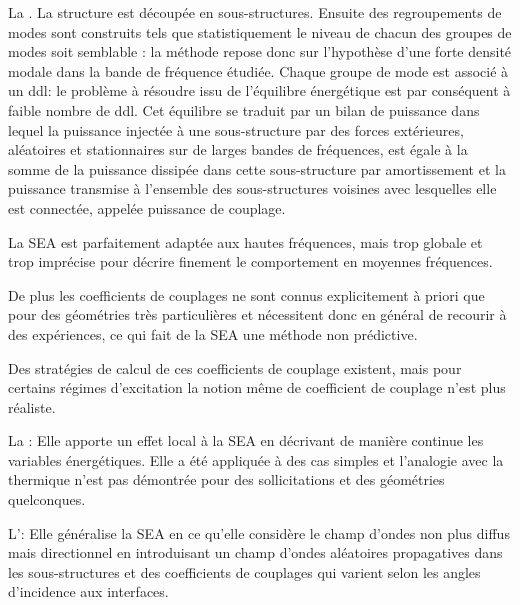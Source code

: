 \bigskip
La .
La structure est découpée en sous-structures.
Ensuite des regroupements de modes sont construits tels que statistiquement le niveau
de chacun des groupes de modes soit semblable : la méthode repose donc sur l'hypothèse
d'une forte densité modale dans la bande de fréquence étudiée.
Chaque groupe de mode est associé à un ddl: le problème à résoudre issu
de l'équilibre énergétique est par conséquent à faible nombre de ddl.
Cet équilibre se traduit par un bilan de puissance dans lequel la puissance injectée
à une sous-structure par des forces extérieures, aléatoires et stationnaires sur de
larges bandes de fréquences, est égale à la somme de la puissance dissipée
dans cette sous-structure par amortissement et la puissance transmise à l'ensemble
des sous-structures voisines avec lesquelles elle est connectée, appelée puissance
de couplage.

La SEA est parfaitement adaptée aux hautes fréquences, mais trop globale et trop imprécise pour
décrire finement le comportement en moyennes fréquences.

De plus les coefficients de couplages ne sont connus explicitement à priori que pour
des géométries très particulières et nécessitent donc en général de recourir
à des expériences, ce qui fait de la SEA une méthode non prédictive.

Des stratégies de calcul de ces coefficients de couplage existent, mais pour certains
régimes d'excitation la notion même de coefficient de couplage n'est plus réaliste.

\bigskip
La : 
Elle apporte un effet local à la SEA en décrivant de manière continue les variables
énergétiques. Elle a été appliquée à des cas simples et l'analogie avec la thermique
n'est pas démontrée pour des sollicitations et des géométries quelconques.

\bigskip
L': 
Elle généralise la SEA en ce qu'elle considère le champ d'ondes non plus diffus mais
directionnel en introduisant un champ d'ondes aléatoires propagatives dans les
sous-structures et des coefficients de couplages qui varient selon les angles
d'incidence aux interfaces.

